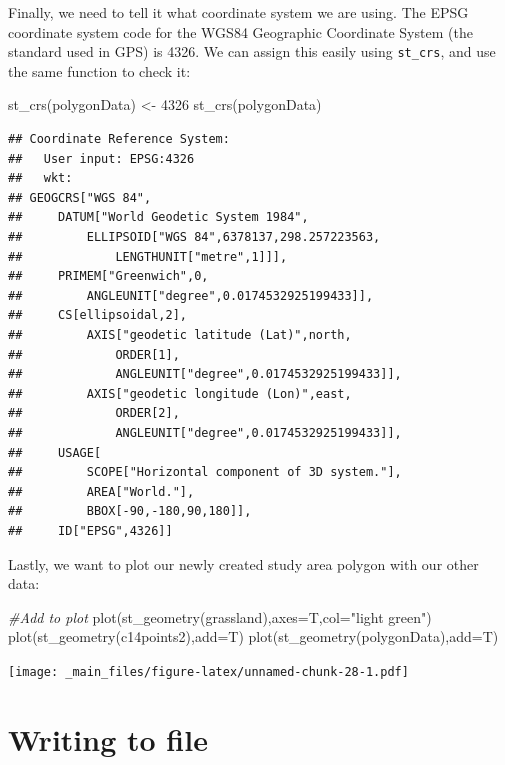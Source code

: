\documentclass[
]{book}
\newenvironment{Shaded}{\begin{snugshade}}{\end{snugshade}}
\newcommand{\AttributeTok}[1]{\textcolor[rgb]{0.77,0.63,0.00}{#1}}
\newcommand{\CommentTok}[1]{\textcolor[rgb]{0.56,0.35,0.01}{\textit{#1}}}
\newcommand{\DecValTok}[1]{\textcolor[rgb]{0.00,0.00,0.81}{#1}}
\newcommand{\FunctionTok}[1]{\textcolor[rgb]{0.00,0.00,0.00}{#1}}
\newcommand{\NormalTok}[1]{#1}
\newcommand{\OtherTok}[1]{\textcolor[rgb]{0.56,0.35,0.01}{#1}}
\newcommand{\StringTok}[1]{\textcolor[rgb]{0.31,0.60,0.02}{#1}}
\begin{document}
Finally, we need to tell it what coordinate system we are using. The EPSG coordinate system code for the WGS84 Geographic Coordinate System (the standard used in GPS) is 4326. We can assign this easily using \texttt{st\_crs}, and use the same function to check it:

\begin{Shaded}
\begin{Highlighting}[]
\FunctionTok{st\_crs}\NormalTok{(polygonData) }\OtherTok{\textless{}{-}} \DecValTok{4326}
\FunctionTok{st\_crs}\NormalTok{(polygonData)}
\end{Highlighting}
\end{Shaded}

\begin{verbatim}
## Coordinate Reference System:
##   User input: EPSG:4326 
##   wkt:
## GEOGCRS["WGS 84",
##     DATUM["World Geodetic System 1984",
##         ELLIPSOID["WGS 84",6378137,298.257223563,
##             LENGTHUNIT["metre",1]]],
##     PRIMEM["Greenwich",0,
##         ANGLEUNIT["degree",0.0174532925199433]],
##     CS[ellipsoidal,2],
##         AXIS["geodetic latitude (Lat)",north,
##             ORDER[1],
##             ANGLEUNIT["degree",0.0174532925199433]],
##         AXIS["geodetic longitude (Lon)",east,
##             ORDER[2],
##             ANGLEUNIT["degree",0.0174532925199433]],
##     USAGE[
##         SCOPE["Horizontal component of 3D system."],
##         AREA["World."],
##         BBOX[-90,-180,90,180]],
##     ID["EPSG",4326]]
\end{verbatim}

Lastly, we want to plot our newly created study area polygon with our other data:

\begin{Shaded}
\begin{Highlighting}[]
\CommentTok{\#Add to plot}
\FunctionTok{plot}\NormalTok{(}\FunctionTok{st\_geometry}\NormalTok{(grassland),}\AttributeTok{axes=}\NormalTok{T,}\AttributeTok{col=}\StringTok{"light green"}\NormalTok{)}
\FunctionTok{plot}\NormalTok{(}\FunctionTok{st\_geometry}\NormalTok{(c14points2),}\AttributeTok{add=}\NormalTok{T)}
\FunctionTok{plot}\NormalTok{(}\FunctionTok{st\_geometry}\NormalTok{(polygonData),}\AttributeTok{add=}\NormalTok{T)}
\end{Highlighting}
\end{Shaded}

\texttt{[image: \_main\_files/figure-latex/unnamed-chunk-28-1.pdf]}

\hypertarget{writing-to-file}{%
\section{Writing to file}\label{writing-to-file}}
\end{document}
